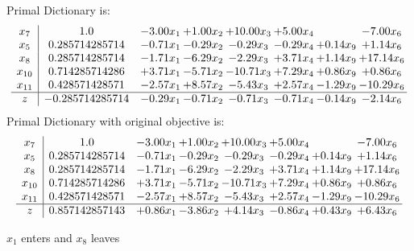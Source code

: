 \documentclass[8pt]{article}
\begin{document}
Primal Dictionary is:
\[\begin{array}{c| c c@{\hskip 2pt} c@{\hskip 2pt} c@{\hskip 2pt} c@{\hskip 2pt} c@{\hskip 2pt} c@{\hskip 2pt} }
 x_{7}   &  1.0 & -3.00 x_{1} & +  1.00 x_{2} & + 10.00 x_{3} & +  5.00 x_{4} &   & -7.00 x_{6}\\
 x_{5}   &  0.285714285714 & -0.71 x_{1} & -0.29 x_{2} & -0.29 x_{3} & -0.29 x_{4} & +  0.14 x_{9} & +  1.14 x_{6}\\
 x_{8}   &  0.285714285714 & -1.71 x_{1} & -6.29 x_{2} & -2.29 x_{3} & +  3.71 x_{4} & +  1.14 x_{9} & + 17.14 x_{6}\\
 x_{10}   &  0.714285714286 & +  3.71 x_{1} & -5.71 x_{2} & -10.71 x_{3} & +  7.29 x_{4} & +  0.86 x_{9} & +  0.86 x_{6}\\
 x_{11}   &  0.428571428571 & -2.57 x_{1} & +  8.57 x_{2} & -5.43 x_{3} & +  2.57 x_{4} & -1.29 x_{9} & -10.29 x_{6}\\
\hline
z    &  -0.285714285714 & -0.29 x_{1} & -0.71 x_{2} & -0.71 x_{3} & -0.71 x_{4} & -0.14 x_{9} & -2.14 x_{6}\\
\end{array}\]
Primal Dictionary with original objective is:
\[\begin{array}{c| c c@{\hskip 2pt} c@{\hskip 2pt} c@{\hskip 2pt} c@{\hskip 2pt} c@{\hskip 2pt} c@{\hskip 2pt} }
 x_{7}   &  1.0 & -3.00 x_{1} & +  1.00 x_{2} & + 10.00 x_{3} & +  5.00 x_{4} &   & -7.00 x_{6}\\
 x_{5}   &  0.285714285714 & -0.71 x_{1} & -0.29 x_{2} & -0.29 x_{3} & -0.29 x_{4} & +  0.14 x_{9} & +  1.14 x_{6}\\
 x_{8}   &  0.285714285714 & -1.71 x_{1} & -6.29 x_{2} & -2.29 x_{3} & +  3.71 x_{4} & +  1.14 x_{9} & + 17.14 x_{6}\\
 x_{10}   &  0.714285714286 & +  3.71 x_{1} & -5.71 x_{2} & -10.71 x_{3} & +  7.29 x_{4} & +  0.86 x_{9} & +  0.86 x_{6}\\
 x_{11}   &  0.428571428571 & -2.57 x_{1} & +  8.57 x_{2} & -5.43 x_{3} & +  2.57 x_{4} & -1.29 x_{9} & -10.29 x_{6}\\
\hline
z    &  0.857142857143 & +  0.86 x_{1} & -3.86 x_{2} & +  4.14 x_{3} & -0.86 x_{4} & +  0.43 x_{9} & +  6.43 x_{6}\\
\end{array}\]


 $ x_{1} $ enters and $ x_{8} $ leaves 
\end{document}
